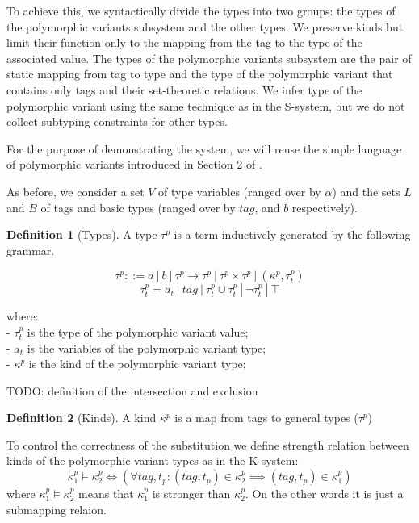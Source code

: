 \documentclass[a4paper,11pt,oneside]{article}
\theoremstyle{definition}
\newtheorem{defsec}{Definition}[section]
\begin{document}
To achieve this, we syntactically divide the types into two groups: the types of the polymorphic variants subsystem and the other types.
We preserve kinds but limit their function only to the mapping from the tag to the type of the associated value.
The types of the polymorphic variants subsystem are the pair of static mapping from tag to type and the type of the polymorphic variant that contains only tags and their set-theoretic relations.
We infer type of the polymorphic variant using the same technique as in the S-system, but we do not collect subtyping constraints for other types.

For the purpose of demonstrating the system, we will reuse the simple
language of polymorphic variants introduced in Section 2 of \cite{Castagna_2016}.

As before, we consider a set $V$ of type variables (ranged over by $\alpha$)
and the sets $L$ and $B$ of tags and basic types (ranged over by $tag$, and
$b$ respectively).

\begin{defsec}[Types]
  A type $\tau^p$ is a term inductively generated by the following grammar.

  $$ \tau^p ::= a\ |\ b\ |\ \tau^p \rightarrow \tau^p\ |\ \tau^p \times \tau^p\ |\ (\kappa^p, \tau^p_t) $$
  $$ \tau^p_t = a_t\ |\ tag\ |\ \tau^p_t \cup \tau^p_t\ |\ \neg \tau^p_t\ |\ \top $$

  where:\\
  - $\tau^p_t$ is the type of the polymorphic variant value; \\
  - $a_t$ is the variables of the polymorphic variant type; \\
  - $\kappa^p$ is the kind of the polymorphic variant type;
\end{defsec}

TODO: definition of the intersection and exclusion

\begin{defsec}[Kinds]
  A kind $\kappa^p$ is a map from tags to general types ($\tau^p$)
\end{defsec}

To control the correctness of the substitution we define strength relation between kinds of the polymorphic variant types as in the K-system:
$$ \kappa_1^p \vDash \kappa_2^p \Leftrightarrow (\forall tag, t_p: (tag,t_p) \in \kappa_2^p \implies (tag,t_p) \in \kappa_1^p)$$
where $\kappa_1^p \vDash \kappa_2^p$ means that $\kappa_1^p$ is stronger than $\kappa_2^p$. On the other words it is just a submapping relaion.
\end{document}
